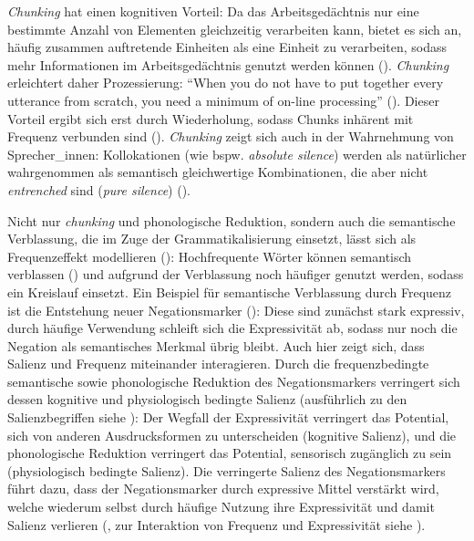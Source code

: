 \textit{Chunking} hat einen kognitiven Vorteil: Da das Arbeitsgedächtnis nur eine bestimmte Anzahl von Elementen gleichzeitig verarbeiten kann, bietet es sich an, häufig zusammen auftretende Einheiten als eine Einheit zu verarbeiten, sodass mehr Informationen im Arbeitsgedächtnis genutzt werden können (\cites[328]{Bybee.2006}[54--55]{Bybee.2013}[15]{Diessel.2017}). \textit{Chunking} erleichtert daher Prozessierung: "`When you do not have to put together every utterance from scratch, you need a minimum of on-line processing"' (\cite[11]{BlumenthalDrame.2012}). Dieser Vorteil ergibt sich erst durch Wiederholung, sodass Chunks inhärent mit Frequenz verbunden sind (\cite[717]{Bybee.2006b}). \textit{Chunking} zeigt sich auch in der Wahrnehmung von Sprecher\_innen: Kollokationen (wie bspw. \textit{absolute silence}) werden als natürlicher wahrgenommen als semantisch gleichwertige Kombinationen, die aber nicht \textit{entrenched} sind (\textit{pure silence}) (\cite{Dabrowska.2014b}).

 

Nicht nur \textit{chunking} und phonologische Reduktion, sondern auch die semantische Verblassung, die im Zuge der Grammatikalisierung einsetzt, lässt sich als Frequenzeffekt modellieren (\cite[379--380]{Bybee.1997}): Hochfrequente Wörter können semantisch verblassen (\cite[174]{Detges.2002}) und aufgrund der Verblassung noch häufiger genutzt werden, sodass ein Kreislauf einsetzt. Ein Beispiel für semantische Verblassung durch Frequenz ist die Entstehung neuer Negationsmarker (\cite[380]{Bybee.1997}): Diese sind zunächst stark expressiv, durch häufige Verwendung schleift sich die Expressivität ab, sodass nur noch die Negation als semantisches Merkmal übrig bleibt. Auch hier zeigt sich, dass Salienz und Frequenz miteinander interagieren. Durch die frequenzbedingte semantische sowie phonologische Reduktion des Negationsmarkers verringert sich dessen kognitive und physiologisch bedingte Salienz (ausführlich zu den Salienzbegriffen siehe \cite{Auer.2014}): Der Wegfall der Expressivität verringert das Potential, sich von anderen Ausdrucksformen zu unterscheiden (kognitive Salienz), und die phonologische Reduktion verringert das Potential, sensorisch zugänglich zu sein (physiologisch bedingte Salienz). Die verringerte Salienz des Negationsmarkers führt dazu, dass der Negationsmarker durch expressive Mittel verstärkt wird, welche wiederum selbst durch häufige Nutzung ihre Expressivität und damit Salienz verlieren (\cite{Jespersen.1917}, zur Interaktion von Frequenz und Expressivität siehe \cite[176--186]{Detges.2002}). 

